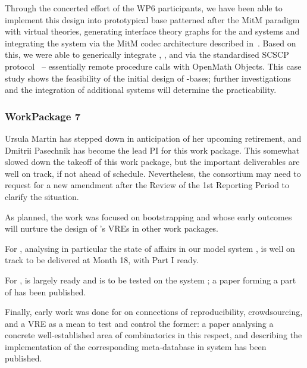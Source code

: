 \documentclass{deliverablereport}
\begin{document}
  Through the concerted effort of the WP6 participants, we have been able to implement
  this design into prototypical \DKS base patterned after the MitM paradigm with virtual
  theories, generating interface theory graphs for the \GAP and \Sage systems and
  integrating the \LMFDB system via the MitM codec architecture described
  in~\cite{ODK-D6.2}. Based on this, we were able to generically integrate \GAP, \Sage,
  and \LMFDB via the standardised SCSCP protocol~\cite{HorRoz:ossp09} -- essentially
  remote procedure calls with OpenMath Objects. This case study shows the feasibility of
  the initial design of \DKS-bases; further investigations and the integration of
  additional systems will determine the practicability.

  \subsubsection{WorkPackage 7}
  Ursula Martin has stepped down in anticipation of her upcoming retirement, and Dmitrii
  Pasechnik has become the lead PI for this work package.  This somewhat slowed down the
  takeoff of this work package, but the important deliverables are well on track, if not
  ahead of schedule. Nevertheless, the consortium may need to request for a new amendment
  after the Review of the 1st Reporting Period to clarify the situation.

  As planned, the work was focused on bootstrapping
   and
   whose early outcomes will nurture
  the design of \ODK's VREs in other work packages.

  For ,
   analysing in particular the state of
  affairs in our model system \Sage, is well on track to be delivered at Month 18, with
  Part I ready.

  For ,
   is largely ready and is to be tested on the
  system \Sage; a paper \cite{Pavlou:2016:MCI:2936924.2936934} forming a part of
   has been published.

  Finally, early work was done for  on connections
  of reproducibility, crowdsourcing, and a VRE as a mean to test and control the former: a
  paper \cite{2016arXiv160100181C} analysing a concrete well-established area of
  combinatorics in this respect, and describing the implementation of the corresponding
  meta-database in \Sage system has been published.
\end{document}

